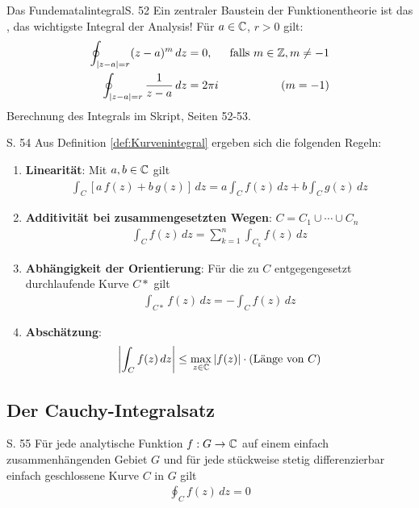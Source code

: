 \begin{bemerkung}{Das Fundematalintegral}{S. 52}
  Ein zentraler Baustein der Funktionentheorie ist das , das wichtigste Integral der Analysis!
  Für $a \in \mathbb{C}$, $r > 0$ gilt:
  \begin{align}
    \oint_{|z-a|=r} (z-a)^m \, dz &= 0, &\text{falls } m \in \mathbb{Z}, m \neq -1 \\
    \oint_{|z-a|=r} \frac{1}{z-a} \, dz &= 2 \pi i & (m = -1)
  \end{align}
  Berechnung des Integrals im Skript, Seiten 52-53.
\end{bemerkung}

\begin{satz}{S. 54}
  Aus Definition \ref{def:Kurvenintegral} ergeben sich die folgenden Regeln:
  \begin{enumerate}[label=\alph*)]
    \item \textbf{Linearität}: Mit $a, b \in \mathbb{C}$ gilt
      \begin{align}
        \int_C \left[ a \, f(z) + b \, g(z) \right] \, dz = a \int_C f(z) \, dz + b \int_C g(z) \, dz
      \end{align}
    \item \textbf{Additivität bei zusammengesetzten Wegen}: $C = C_1 \cup \cdots \cup C_n$
      \begin{align}
        \int_C f(z) \, dz = \sum_{k=1}^n \int_{C_k} f(z) \, dz
      \end{align}
    \item \textbf{Abhängigkeit der Orientierung}: Für die zu $C$ entgegengesetzt durchlaufende Kurve $C*$ gilt
      \begin{align}
        \int_{C*} f(z) \, dz = - \int_{C} f(z) \, dz
      \end{align}
    \item \textbf{Abschätzung}:
      \begin{align}
        \left| \int_{C} f(z) \, dz \right| \leq \max_{z \in \mathbb{C}} \left| f(z) \right| \cdot (\text{Länge von } C)
      \end{align}
  \end{enumerate}
\end{satz}



\subsection{Der Cauchy-Integralsatz}

\begin{satz}{S. 55}
  \label{satz:cauchy_integralsatz}
  Für jede analytische Funktion $f: G \to \mathbb{C}$ auf einem einfach zusammenhängenden Gebiet $G$ und für jede stückweise stetig differenzierbar einfach geschlossene Kurve $C$ in $G$ gilt
  \begin{align}
    \oint_C f(z) \, dz = 0
  \end{align}
\end{satz}

